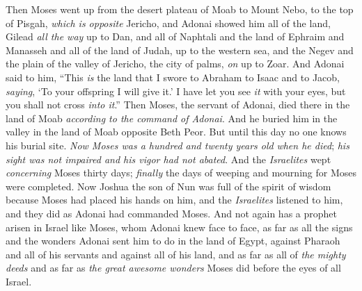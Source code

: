 \begin{biblechapter} %
 Then Moses went up from the desert plateau of Moab to Mount Nebo, to the top of Pisgah, \textit{which is opposite} Jericho, and Adonai showed him all of the land, Gilead \textit{all the way} up to Dan,
\verse and all of Naphtali and the land of Ephraim and Manasseh and all of the land of Judah, up to the western sea,
\verse and the Negev and the plain of the valley of Jericho, the city of palms, \textit{on} up to Zoar.
\verse And Adonai said to him, “This \textit{is} the land that I swore to Abraham to Isaac and to Jacob, \textit{saying}, ‘To your offspring I will give it.’ I have let you see \textit{it} with your eyes, but you shall not cross \textit{into it}.”
\verse Then Moses, the servant of Adonai, died there in the land of Moab \textit{according to the command of Adonai}.
\verse And he buried him in the valley in the land of Moab opposite Beth Peor. But until this day no one knows his burial site.
\verse \textit{Now Moses was a hundred and twenty years old} \textit{when he died}; \textit{his sight was not impaired and his vigor had not abated}.
\verse And the \textit{Israelites} wept \textit{concerning} Moses thirty days; \textit{finally} the days of weeping and mourning for Moses were completed.
\verse Now Joshua the son of Nun was full of the spirit of wisdom because Moses had placed his hands on him, and the \textit{Israelites} listened to him, and they did as Adonai had commanded Moses.
\verse And not again has a prophet arisen in Israel like Moses, whom Adonai knew face to face,
\verse as far as all the signs and the wonders Adonai sent him to do in the land of Egypt, against Pharaoh and all of his servants and against all of his land,
\verse and as far as all of \textit{the mighty deeds} and as far as \textit{the great awesome wonders} Moses did before the eyes of all Israel.
\end{biblechapter}

